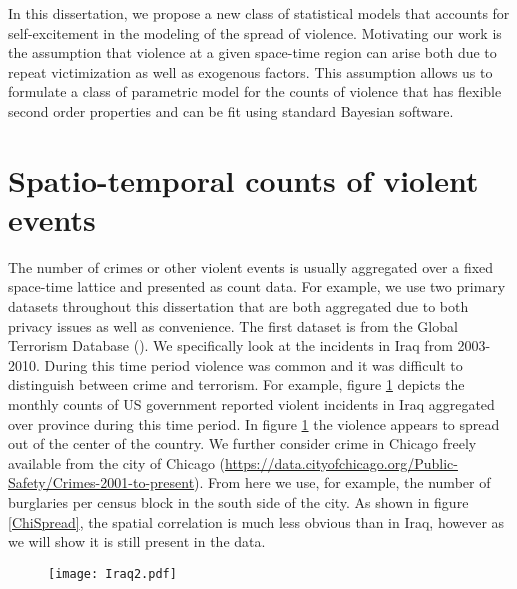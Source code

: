 \documentclass[11pt]{isuthesis}
\begin{document}
In this dissertation, we propose a new class of statistical models that accounts for self-excitement in the modeling of the spread of violence.  Motivating our work is the assumption that violence at a given space-time region can arise both due to repeat victimization as well as  exogenous factors.  This assumption allows us to formulate a class of parametric model for the counts of violence that has flexible second order properties and can be fit using standard Bayesian software.

\section{Spatio-temporal counts of violent events}

The number of crimes or other violent events is usually aggregated over a fixed space-time lattice and presented as count data.  For example, we use two primary datasets throughout this dissertation that are both aggregated due to both privacy issues as well as convenience.  The first dataset is from the Global Terrorism Database (\cite{lafree2007introducing}).  We specifically look at the incidents in Iraq from 2003-2010.  During this time period violence was common and it was difficult to distinguish between crime and terrorism.  For example, figure \ref{IZSpread} depicts the monthly counts of US government reported violent incidents in Iraq aggregated over province during this time period.  In figure \ref{IZSpread} the violence appears to spread out of the center of the country.  We further consider crime in Chicago freely available from the city of Chicago (\href{https://data.cityofchicago.org/Public-Safety/Crimes-2001-to-present}{https://data.cityofchicago.org/Public-Safety/Crimes-2001-to-present}).  From here we use, for example, the number of burglaries per census block in the south side of the city.  As shown in figure \ref{ChiSpread}, the spatial correlation is much less obvious than in Iraq, however as we will show it is still present in the data.

\begin{figure}[h] %
	\begin{center}
		\vspace{6pc}
		\texttt{[image: Iraq2.pdf]}
		\label{IZSpread}
	\end{center}
\end{figure} 
\end{document}
